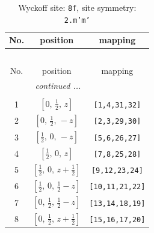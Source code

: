 \documentclass[fleqn,8pt]{jsarticle}
\begin{document}
\begin{longtable}{ccc}
\caption{Wyckoff site: {\tt 8f}, site symmetry: {\tt 2.m'm'}}
 \\
 \hline \hline
No. & position & mapping \\ \hline \endfirsthead

\multicolumn{2}{l}{\tablename\ \thetable{}} \\
 \hline \hline
No. & position & mapping \\ \hline \endhead

 \hline \hline
\multicolumn{2}{r}{\footnotesize\it continued ...} \\ \endfoot

 \hline \hline
\multicolumn{2}{r}{} \\ \endlastfoot

1 & $\left[ 0,\, \frac{1}{2},\, z \right]$ & {\tt [1,4,31,32]} \\ \hline
2 & $\left[ 0,\, \frac{1}{2},\, - z \right]$ & {\tt [2,3,29,30]} \\ \hline
3 & $\left[ \frac{1}{2},\, 0,\, - z \right]$ & {\tt [5,6,26,27]} \\ \hline
4 & $\left[ \frac{1}{2},\, 0,\, z \right]$ & {\tt [7,8,25,28]} \\ \hline
5 & $\left[ \frac{1}{2},\, 0,\, z + \frac{1}{2} \right]$ & {\tt [9,12,23,24]} \\ \hline
6 & $\left[ \frac{1}{2},\, 0,\, \frac{1}{2} - z \right]$ & {\tt [10,11,21,22]} \\ \hline
7 & $\left[ 0,\, \frac{1}{2},\, \frac{1}{2} - z \right]$ & {\tt [13,14,18,19]} \\ \hline
8 & $\left[ 0,\, \frac{1}{2},\, z + \frac{1}{2} \right]$ & {\tt [15,16,17,20]} \\
\end{longtable}
\renewcommand{\arraystretch}{1.2}
\end{document}
